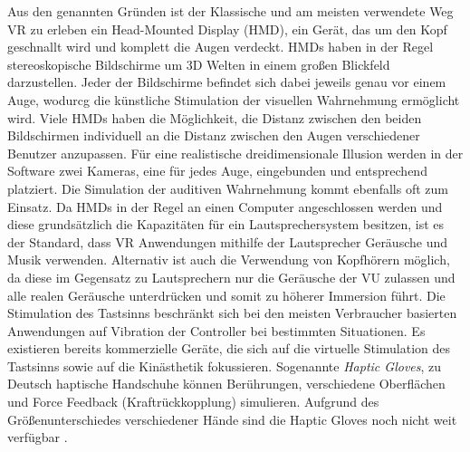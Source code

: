 Aus den genannten Gründen ist der Klassische und am meisten verwendete Weg VR zu erleben ein Head-Mounted Display (HMD), ein Gerät, das um den Kopf geschnallt wird und komplett die Augen verdeckt. HMDs haben in der Regel stereoskopische Bildschirme um 3D Welten in einem großen Blickfeld darzustellen. Jeder der Bildschirme befindet sich dabei jeweils genau vor einem Auge, wodurcg die künstliche Stimulation der visuellen Wahrnehmung ermöglicht wird. Viele HMDs haben die Möglichkeit, die Distanz zwischen den beiden Bildschirmen individuell an die Distanz zwischen den Augen verschiedener Benutzer anzupassen. Für eine realistische dreidimensionale Illusion werden in der Software zwei Kameras, eine für jedes Auge, eingebunden und entsprechend platziert.
Die Simulation der auditiven Wahrnehmung kommt ebenfalls oft zum Einsatz. Da HMDs in der Regel an einen Computer angeschlossen werden und diese grundsätzlich die Kapazitäten für ein Lautsprechersystem besitzen, ist es der Standard, dass VR Anwendungen mithilfe der Lautsprecher Geräusche und Musik verwenden. Alternativ ist auch die Verwendung von Kopfhörern möglich, da diese im Gegensatz zu Lautsprechern nur die Geräusche der VU zulassen und alle realen Geräusche unterdrücken und somit zu höherer Immersion führt. Die Stimulation des Tastsinns beschränkt sich bei den meisten Verbraucher basierten Anwendungen auf Vibration der Controller bei bestimmten Situationen. Es existieren bereits kommerzielle Geräte, die sich auf die virtuelle Stimulation des Tastsinns sowie auf die Kinästhetik fokussieren. Sogenannte \textit{Haptic Gloves}, zu Deutsch haptische Handschuhe können Berührungen, verschiedene Oberflächen und Force Feedback (Kraftrückkopplung) simulieren. Aufgrund des Größenunterschiedes verschiedener Hände sind die Haptic Gloves noch nicht weit verfügbar \cite{Perret2018}.

